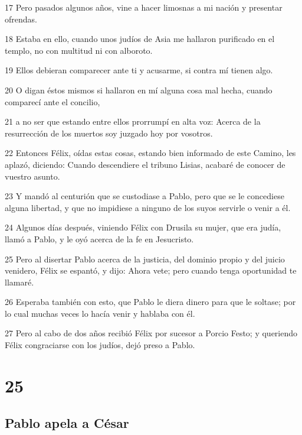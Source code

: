 \par 17 Pero pasados algunos años, vine a hacer limosnas a mi nación y presentar ofrendas.
\par 18 Estaba en ello, cuando unos judíos de Asia me hallaron purificado en el templo, no con multitud ni con alboroto.
\par 19 Ellos debieran comparecer ante ti y acusarme, si contra mí tienen algo.
\par 20 O digan éstos mismos si hallaron en mí alguna cosa mal hecha, cuando comparecí ante el concilio,
\par 21 a no ser que estando entre ellos prorrumpí en alta voz: Acerca de la resurrección de los muertos soy juzgado hoy por vosotros.
\par 22 Entonces Félix, oídas estas cosas, estando bien informado de este Camino, les aplazó, diciendo: Cuando descendiere el tribuno Lisias, acabaré de conocer de vuestro asunto.
\par 23 Y mandó al centurión que se custodiase a Pablo, pero que se le concediese alguna libertad, y que no impidiese a ninguno de los suyos servirle o venir a él.
\par 24 Algunos días después, viniendo Félix con Drusila su mujer, que era judía, llamó a Pablo, y le oyó acerca de la fe en Jesucristo.
\par 25 Pero al disertar Pablo acerca de la justicia, del dominio propio y del juicio venidero, Félix se espantó, y dijo: Ahora vete; pero cuando tenga oportunidad te llamaré.
\par 26 Esperaba también con esto, que Pablo le diera dinero para que le soltase; por lo cual muchas veces lo hacía venir y hablaba con él.
\par 27 Pero al cabo de dos años recibió Félix por sucesor a Porcio Festo; y queriendo Félix congraciarse con los judíos, dejó preso a Pablo.

\chapter{25}

\section*{Pablo apela a César}

